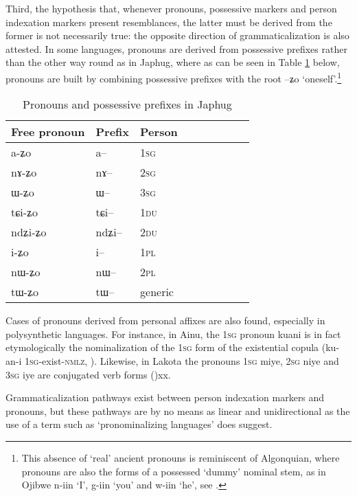 \documentclass[oldfontcommands,oneside,a4paper,11pt]{article}
\newcommand{\ipa}[1]{{\phon \mbox{#1}}} %
\begin{document}
Third, the hypothesis that, whenever pronouns, possessive markers and person indexation markers present resemblances, the latter must be derived from the former is not necessarily true: the opposite direction of grammaticalization is also attested. In some languages, pronouns are derived from possessive prefixes rather than the other way round as in Japhug, where as can be seen in Table \ref{tab:pronoun} below, pronouns are built by combining possessive prefixes with the root \ipa{--ʑo} `oneself'.\footnote{This absence of `real' ancient pronouns is reminiscent of Algonquian, where pronouns are also the forms of a possessed `dummy' nominal stem, as in Ojibwe \ipa{n-iin} `I', \ipa{g-iin} `you' and \ipa{w-iin} `he', see \citet{valentine01grammar}. }

 \begin{table}[H] \centering
\caption{Pronouns and possessive prefixes in Japhug}\label{tab:pronoun}
\begin{tabular}{lllllllll} 
\toprule
 Free pronoun & Prefix & Person\\
\midrule
 \ipa{a-ʑo}  &	\ipa{a--}  &		1\textsc{sg} \\
\ipa{nɤ-ʑo}  &	\ipa{nɤ--}  &			2\textsc{sg}\\
\ipa{ɯ-ʑo}  &	\ipa{ɯ--}  &			3\textsc{sg}\\
\midrule
\ipa{tɕi-ʑo}  &	\ipa{tɕi--}  &			1\textsc{du} \\
\ipa{ndʑi-ʑo}  &	\ipa{ndʑi--}  &		2\textsc{du} \\	
\midrule
\ipa{i-ʑo}    &	\ipa{i--}  &			1\textsc{pl} \\
\ipa{nɯ-ʑo}   &	\ipa{nɯ--}  &			2\textsc{pl} \\
\midrule
\ipa{tɯ-ʑo} & \ipa{tɯ--}   &  generic\\
\bottomrule
\end{tabular}
\end{table}

Cases of pronouns derived from personal affixes are also found, especially in polysynthetic languages. For instance, in Ainu, the \textsc{1sg} pronoun \ipa{kuani} is in fact etymologically the nominalization of the \textsc{1sg} form of the existential copula (\ipa{ku-an-i} \textsc{1sg}-exist-\textsc{nmlz}, \citealt[31]{shibatani90japan}). Likewise, in Lakota the pronouns \textsc{1sg} \ipa{miye}, \textsc{2sg} \ipa{niye} and \textsc{3sg} \ipa{iye} are conjugated verb forms (\citealt{ullrich08})xx.

Grammaticalization pathways exist between person indexation markers and pronouns, but these pathways are by no means as linear and unidirectional as the use of a term such as `pronominalizing languages' does suggest. 
\end{document}
